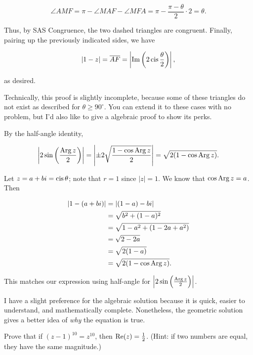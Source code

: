 \documentclass[../key.tex]{subfiles}
\begin{document}
$$\angle AMF = \pi - \angle MAF - \angle MFA = \pi - \frac{\pi - \theta}{2} \cdot 2 = \theta.$$

Thus, by SAS Congruence, the two dashed triangles are congruent. Finally, pairing up the previously indicated sides, we have

$$|1-z|=\overline{AF}=\left|\operatorname{Im}\left(2\operatorname{cis}\frac{\theta}{2}\right)\right|,$$

as desired.

Technically, this proof is slightly incomplete, because some of these triangles do not exist as described for $\theta \geq 90^\circ$. You can extend it to these cases with no problem, but I'd also like to give a algebraic proof to show its perks.

By the half-angle identity,

$$\left|2 \sin\left(\frac{\operatorname{Arg} z}{2}\right)\right| = \left|\pm 2\sqrt{\frac{1 - \cos\operatorname{Arg} z}{2}}\right| = \sqrt{2(1-\cos\operatorname{Arg} z)}.$$

Let $z=a+bi=\operatorname{cis} \theta$; note that $r=1$ since $|z|=1$. We know that $\cos\operatorname{Arg} z = a$. Then

\begin{align*}
|1-(a+bi)| &= |(1-a) - bi| \\
&= \sqrt{b^2 + (1-a)^2} \\
&= \sqrt{1 - a^2 + (1 - 2a + a^2)} \\
&= \sqrt{2 - 2a} \\
&= \sqrt{2(1-a)} \\
&= \sqrt{2(1-\cos\operatorname{Arg} z)}.
\end{align*}

This matches our expression using half-angle for $\left|2\sin\left(\frac{\operatorname{Arg} z}{2}\right)\right|$.

I have a slight preference for the algebraic solution because it is quick, easier to understand, and mathematically complete. Nonetheless, the geometric solution gives a better idea of \textit{why} the equation is true.

\begin{outer_problem}
\item
\end{outer_problem}

\begin{inner_problem}[start=1]
\item Prove that if $(z-1)^{10}=z^{10}$, then $\operatorname{Re} (z) = \frac{1}{2}$. (Hint: if two numbers are equal, they have the same magnitude.)
\end{inner_problem}
\end{document}
